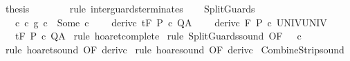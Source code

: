 \begin{isabellebody}
\ {\isacharquery}thesis\isanewline
\ \ \ \ \ \ \isamarkupfalse%
\ {\isacharparenleft}rule\ inter{\isacharunderscore}guards{\isacharunderscore}terminates{\isacharparenright}\isanewline
\ \ \isamarkupfalse%
\isanewline
{}\isamarkupfalse%
%
\endisatagproof
{\isafoldproof}%
%
\isadelimproof
\isanewline
%
\endisadelimproof
\isanewline
{}\isamarkupfalse%
\ SplitGuards{\isacharcolon}\ \isanewline
\ \ \ c{\isacharcolon}\ {\isachardoublequoteopen}{\isacharparenleft}c\ {\isasyminter}\isactrlsub g\ c\ {\isacharequal}\ Some\ c{\isachardoublequoteclose}\ \isanewline
\ \ \ deriv{\isacharunderscore}c{}{\isacharcolon}\ {\isachardoublequoteopen}{\isasymGamma}{\isacharcomma}{\isasymTheta}{\isasymturnstile}\isactrlsub t\isactrlbsub {\isacharslash}F\isactrlesub \ P\ c\ Q{\isacharcomma}A{\isachardoublequoteclose}\ \isanewline
\ \ \ deriv{\isacharunderscore}c{}{\isacharcolon}\ {\isachardoublequoteopen}{\isasymGamma}{\isacharcomma}{\isasymTheta}{\isasymturnstile}\isactrlbsub {\isacharslash}F\isactrlesub \ P\ c\ UNIV{\isacharcomma}UNIV{\isachardoublequoteclose}\ \isanewline
\ \ \ {\isachardoublequoteopen}{\isasymGamma}{\isacharcomma}{\isasymTheta}{\isasymturnstile}\isactrlsub t\isactrlbsub {\isacharslash}F\isactrlesub \ P\ c\ Q{\isacharcomma}A{\isachardoublequoteclose}\isanewline
%
\isadelimproof
%
\endisadelimproof
%
\isatagproof
{}\isamarkupfalse%
\ {\isacharparenleft}rule\ hoaret{\isacharunderscore}complete{\isacharprime}{\isacharparenright}\isanewline
{}\isamarkupfalse%
\ {\isacharparenleft}rule\ SplitGuards{\isacharunderscore}sound\ {\isacharbrackleft}OF\ {\isacharunderscore}\ {\isacharunderscore}\ c{\isacharbrackright}{\isacharparenright}\isanewline
{}\isamarkupfalse%
\ {\isacharparenleft}rule\ hoaret{\isacharunderscore}sound\ {\isacharbrackleft}OF\ deriv{\isacharunderscore}c{}{\isacharbrackright}{\isacharparenright}\isanewline
{}\isamarkupfalse%
\ {\isacharparenleft}rule\ hoare{\isacharunderscore}sound\ {\isacharbrackleft}OF\ deriv{\isacharunderscore}c{}{\isacharbrackright}{\isacharparenright}\isanewline
{}\isamarkupfalse%
%
\endisatagproof
{\isafoldproof}%
%
\isadelimproof
\isanewline
%
\endisadelimproof
\isanewline
{}\isamarkupfalse%
\ CombineStrip{\isacharunderscore}sound{\isacharcolon}\isanewline

\end{isabellebody}
